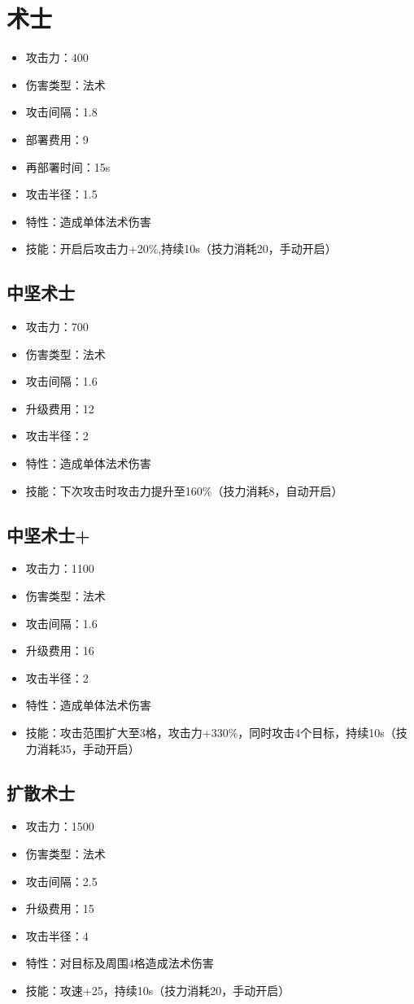 \documentclass[a4paper,12pt]{article}
\begin{document}
	\section{术士}
		\begin{itemize}
			\item 攻击力：400
			\item 伤害类型：法术
			\item 攻击间隔：1.8
			\item 部署费用：9
			\item 再部署时间：15s
			\item 攻击半径：1.5
			\item 特性：造成单体法术伤害
			\item 技能：开启后攻击力+20\%,持续10s（技力消耗20，手动开启）
		\end{itemize}
		\subsection{中坚术士}
			\begin{itemize}
				\item 攻击力：700
				\item 伤害类型：法术
				\item 攻击间隔：1.6
				\item 升级费用：12
				\item 攻击半径：2
				\item 特性：造成单体法术伤害
				\item 技能：下次攻击时攻击力提升至160\%（技力消耗8，自动开启）
			\end{itemize}
		\subsection{中坚术士+}
			\begin{itemize}
				\item 攻击力：1100
				\item 伤害类型：法术
				\item 攻击间隔：1.6
				\item 升级费用：16
				\item 攻击半径：2
				\item 特性：造成单体法术伤害
				\item 技能：攻击范围扩大至3格，攻击力+330\%，同时攻击4个目标，持续10s（技力消耗35，手动开启）
			\end{itemize}
		\subsection{扩散术士}
			\begin{itemize}
				\item 攻击力：1500
				\item 伤害类型：法术
				\item 攻击间隔：2.5
				\item 升级费用：15
				\item 攻击半径：4
				\item 特性：对目标及周围4格造成法术伤害
				\item 技能：攻速+25，持续10s（技力消耗20，手动开启）
			\end{itemize}
\end{document}
